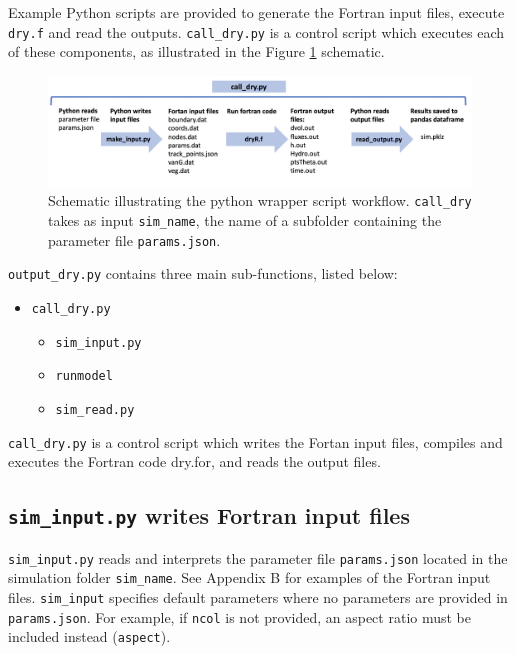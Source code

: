 \documentclass{article}
\newcommand{\code}[1]{\texttt{#1}}
\begin{document}


Example Python scripts are provided to generate the Fortran input files, execute \code{dry.f} and read the outputs.   \code{call\_dry.py} is a control script which executes each of these components, as illustrated in the Figure \ref{schematic} schematic.

 \begin{figure}[h]
 \centering
\includegraphics[width=38pc]{grid/schematic.png}
 \caption{Schematic illustrating the python wrapper script workflow. \code{call\_dry} takes as input \code{sim\_name}, the name of a subfolder containing the parameter file \code{params.json}.}
 \label{schematic}
 \end{figure}
 
 
\code{output\_dry.py} contains three main sub-functions, listed below:
 \begin{itemize}
 	\item  \code{call\_dry.py} 
	\begin{itemize}
		\item \code{sim\_input.py} 
		\item \code{runmodel}
		\item \code{sim\_read.py}
	\end{itemize}
 \end{itemize}
 
 \code{call\_dry.py}  is a control script which writes the Fortan input files, compiles and executes the Fortran code dry.for, and reads the output files.

 
\subsection{\code{sim\_input.py} writes Fortran input files}

\code{sim\_input.py} reads and interprets the parameter file \code{params.json} located in the simulation folder \code{sim\_name}.   See Appendix B for examples of the Fortran input files.
 \code{sim\_input} specifies default parameters where no parameters are provided in \code{params.json}. For example, if \code{ncol} is not provided, an aspect ratio must be included instead (\code{aspect}).
 
\end{document}
